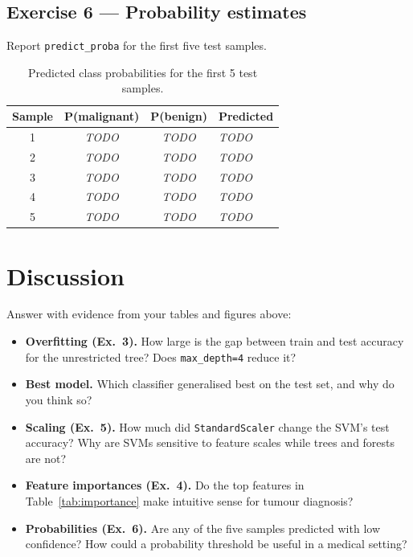 \documentclass[11pt,a4paper]{article}
\begin{document}
\subsection{Exercise 6 — Probability estimates}
Report \lstinline|predict_proba| for the first five test samples.
\begin{table}[H]
\centering
\caption{Predicted class probabilities for the first 5 test samples.}
\label{tab:proba}
\begin{tabular}{@{}cccl@{}}
\toprule
\textbf{Sample} & \textbf{P(malignant)} & \textbf{P(benign)} & \textbf{Predicted} \\
\midrule
1 & \textit{TODO} & \textit{TODO} & \textit{TODO} \\
2 & \textit{TODO} & \textit{TODO} & \textit{TODO} \\
3 & \textit{TODO} & \textit{TODO} & \textit{TODO} \\
4 & \textit{TODO} & \textit{TODO} & \textit{TODO} \\
5 & \textit{TODO} & \textit{TODO} & \textit{TODO} \\
\bottomrule
\end{tabular}
\end{table}

\section{Discussion}
Answer with evidence from your tables and figures above:
\begin{itemize}[leftmargin=*]
  \item \textbf{Overfitting (Ex.~3).} How large is the gap between train and test
        accuracy for the unrestricted tree? Does \lstinline|max_depth=4| reduce it?
  \item \textbf{Best model.} Which classifier generalised best on the test set, and
        why do you think so?
  \item \textbf{Scaling (Ex.~5).} How much did \lstinline|StandardScaler| change the
        SVM's test accuracy? Why are SVMs sensitive to feature scales while trees
        and forests are not?
  \item \textbf{Feature importances (Ex.~4).} Do the top features in
        Table~\ref{tab:importance} make intuitive sense for tumour diagnosis?
  \item \textbf{Probabilities (Ex.~6).} Are any of the five samples predicted with
        low confidence? How could a probability threshold be useful in a medical
        setting?
\end{itemize}
\end{document}
